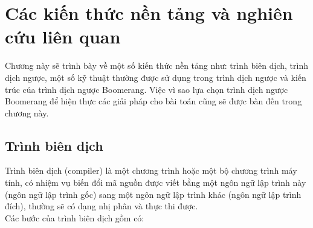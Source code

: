 \chapter{Các kiến thức nền tảng và nghiên cứu liên quan}
Chương này sẽ trình bày về một số kiến thức nền tảng như: trình biên dịch, trình dịch ngược, một số kỹ thuật thường được sử dụng trong trình dịch ngược và kiến trúc của trình dịch ngược Boomerang. Việc vì sao lựa chọn trình dịch ngược Boomerang để hiện thực các giải pháp cho bài toán cũng sẽ được bàn đến trong chương này. \\
\section{Trình biên dịch}
Trình biên dịch (compiler) là một chương trình hoặc một bộ chương trình máy tính, có nhiệm vụ biến đổi mã nguồn được viết bằng một ngôn ngữ lập trình này (ngôn ngữ lập trình gốc) sang một ngôn ngữ lập trình khác (ngôn ngữ lập trình đích), thường sẽ có dạng nhị phân và thực thi được. \\
Các bước của trình biên dịch gồm có:
